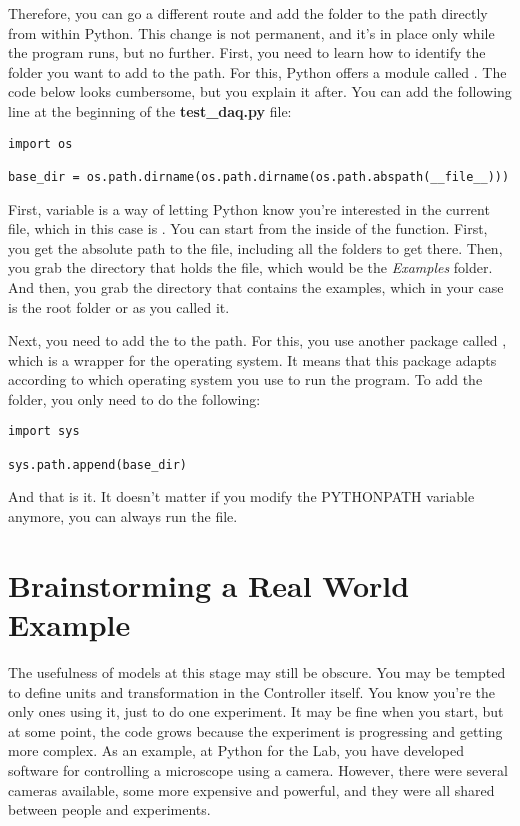 Therefore, you can go a different route and add the folder to the path directly from within Python. This change is not permanent, and it's in place only while the program runs, but no further. First, you need to learn how to identify the folder you want to add to the path. For this, Python offers a module called . The code below looks cumbersome, but you explain it after. You can add the following line at the beginning of the \textbf{test\_daq.py} file:

\begin{verbatim}
import os

base_dir = os.path.dirname(os.path.dirname(os.path.abspath(__file__)))
\end{verbatim}

First,  variable is a way of letting Python know you're interested in the current file, which in this case is . You can start from the inside of the function. First, you get the absolute path to the file, including all the folders to get there. Then, you grab the directory that holds the file, which would be the \emph{Examples} folder. And then, you grab the directory that contains the examples, which in your case is the root folder or  as you called it.

Next, you need to add the  to the path. For this, you use another package called , which is a wrapper for the operating system. It means that this package adapts according to which operating system you use to run the program. To add the folder, you only need to do the following:

\begin{verbatim}
import sys

sys.path.append(base_dir)
\end{verbatim}

And that is it. It doesn't matter if you modify the PYTHONPATH variable anymore, you can always run the  file.


\section{Brainstorming a Real World Example}\label{sec:real-world-model}
The usefulness of models at this stage may still be obscure. You may be tempted to define units and transformation in the Controller itself. You know you're the only ones using it, just to do one experiment. It may be fine when you start, but at some point, the code grows because the experiment is progressing and getting more complex. As an example, at Python for the Lab, you have developed software for controlling a microscope using a camera. However, there were several cameras available, some more expensive and powerful, and they were all shared between people and experiments.

